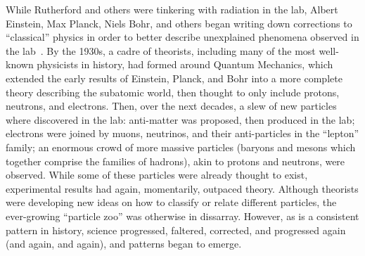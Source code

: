 \begin{dissertationintroduction}
While Rutherford and others were tinkering with radiation in the lab, Albert Einstein, Max Planck, Niels Bohr, and others began writing down corrections to ``classical'' physics in order to better describe unexplained phenomena observed in the lab~\cite{EinsteinPhotoelectric, Planck, Bohr}. 
By the 1930s, a cadre of theorists, including many of the most well-known physicists in history\footnotemark{}, had formed around Quantum Mechanics, which extended the early results of Einstein, Planck, and Bohr into a more complete theory describing the subatomic world, then thought to only include protons, neutrons, and electrons. 
Then, over the next decades, a slew of new particles where discovered in the lab: 
anti-matter was proposed, then produced in the lab; %
electrons were joined by muons, neutrinos, and their anti-particles in the ``lepton'' family; %
an enormous crowd of more massive particles (baryons and mesons which together comprise the families of hadrons), akin to protons and neutrons, were observed. %
While some of these particles were already thought to exist, experimental results had again, momentarily, outpaced theory. 
Although theorists were developing new ideas on how to classify or relate different particles, the ever-growing ``particle zoo'' was otherwise in dissarray. 
However, as is a consistent pattern in history, science progressed, faltered, corrected, and progressed again (and again, and again), and patterns began to emerge. 


\end{dissertationintroduction}
